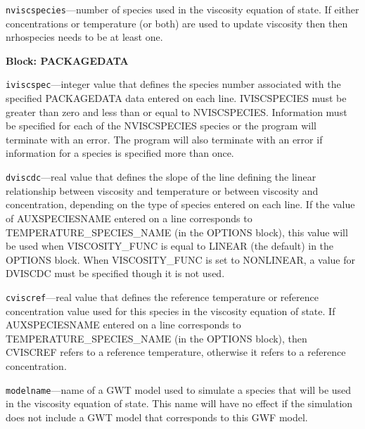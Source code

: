 \begin{description}
\item \texttt{nviscspecies}---number of species used in the viscosity equation of state.  If either concentrations or temperature (or both) are used to update viscosity then then nrhospecies needs to be at least one.

\end{description}
\item \textbf{Block: PACKAGEDATA}

\begin{description}
\item \texttt{iviscspec}---integer value that defines the species number associated with the specified PACKAGEDATA data entered on each line. IVISCSPECIES must be greater than zero and less than or equal to NVISCSPECIES. Information must be specified for each of the NVISCSPECIES species or the program will terminate with an error.  The program will also terminate with an error if information for a species is specified more than once.

\item \texttt{dviscdc}---real value that defines the slope of the line defining the linear relationship between viscosity and temperature or between viscosity and concentration, depending on the type of species entered on each line.  If the value of AUXSPECIESNAME entered on a line corresponds to TEMPERATURE\_SPECIES\_NAME (in the OPTIONS block), this value will be used when VISCOSITY\_FUNC is equal to LINEAR (the default) in the OPTIONS block.  When VISCOSITY\_FUNC is set to NONLINEAR, a value for DVISCDC must be specified though it is not used.

\item \texttt{cviscref}---real value that defines the reference temperature or reference concentration value used for this species in the viscosity equation of state.  If AUXSPECIESNAME entered on a line corresponds to TEMPERATURE\_SPECIES\_NAME (in the OPTIONS block), then CVISCREF refers to a reference temperature, otherwise it refers to a reference concentration.

\item \texttt{modelname}---name of a GWT model used to simulate a species that will be used in the viscosity equation of state.  This name will have no effect if the simulation does not include a GWT model that corresponds to this GWF model.


\end{description}
